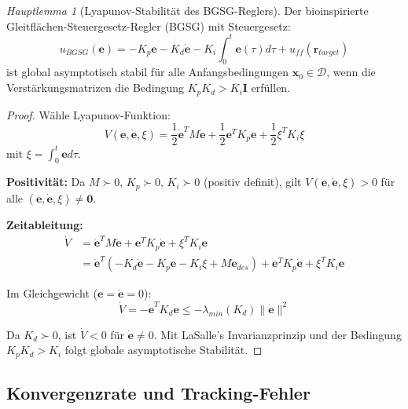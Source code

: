 ﻿\documentclass[12pt,a4paper]{article}
\theoremstyle{remark}
\newtheorem{hauptlemma}{Hauptlemma}[section]
\begin{document}
	\begin{hauptlemma}[Lyapunov-Stabilität des BGSG-Reglers]\label{lem:lyap}
		Der bioinspirierte Gleitflächen-Steuergesetz-Regler (BGSG) mit Steuergesetz:
		\begin{equation}
			u_{BGSG}(\mathbf{e}) = -K_p \mathbf{e} - K_d \dot{\mathbf{e}} - K_i \int_0^t \mathbf{e}(\tau) d\tau + u_{ff}(\mathbf{r}_{target})
			\label{eq:bgsg}
		\end{equation}
		ist global asymptotisch stabil für alle Anfangsbedingungen $\mathbf{x}_0 \in \mathcal{D}$, wenn die Verstärkungsmatrizen die Bedingung $K_p K_d > K_i \mathbf{I}$ erfüllen.
	\end{hauptlemma}
	
	\begin{proof}
		Wähle Lyapunov-Funktion:
		\begin{equation}
			V(\mathbf{e}, \dot{\mathbf{e}}, \xi) = \frac{1}{2}\dot{\mathbf{e}}^T M \dot{\mathbf{e}} + \frac{1}{2}\mathbf{e}^T K_p \mathbf{e} + \frac{1}{2}\xi^T K_i \xi
			\label{eq:lyapunov}
		\end{equation}
		mit $\xi = \int_0^t \mathbf{e}d\tau$.
		
		\textbf{Positivität:} Da $M \succ 0$, $K_p \succ 0$, $K_i \succ 0$ (positiv definit), gilt $V(\mathbf{e}, \dot{\mathbf{e}}, \xi) > 0$ für alle $(\mathbf{e}, \dot{\mathbf{e}}, \xi) \neq \mathbf{0}$.
		
		\textbf{Zeitableitung:}
		\begin{align}
			\dot{V} &= \dot{\mathbf{e}}^T M \ddot{\mathbf{e}} + \mathbf{e}^T K_p \dot{\mathbf{e}} + \xi^T K_i \mathbf{e} \\
			&= \dot{\mathbf{e}}^T \left(- K_d \dot{\mathbf{e}} - K_p \mathbf{e} - K_i \xi + M\ddot{\mathbf{e}}_{des}\right) + \mathbf{e}^T K_p \dot{\mathbf{e}} + \xi^T K_i \mathbf{e}
		\end{align}
		
		Im Gleichgewicht ($\mathbf{e} = \dot{\mathbf{e}} = 0$):
		\begin{equation}
			\dot{V} = -\dot{\mathbf{e}}^T K_d \dot{\mathbf{e}} \leq -\lambda_{min}(K_d) \|\dot{\mathbf{e}}\|^2
		\end{equation}
		
		Da $K_d \succ 0$, ist $\dot{V} < 0$ für $\dot{\mathbf{e}} \neq 0$. Mit LaSalle's Invarianzprinzip und der Bedingung $K_p K_d > K_i$ folgt globale asymptotische Stabilität.
	\end{proof}
	
	\subsection{Konvergenzrate und Tracking-Fehler}
	
\end{document}
